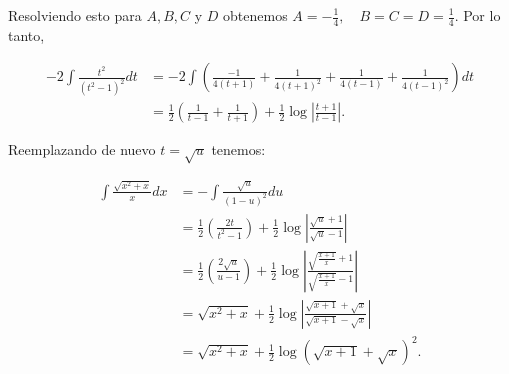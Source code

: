 \documentclass{report}
\begin{document}
\begin{enumerate}
        Resolviendo esto para $A, B, C$ y $D$ obtenemos $A=-\frac{1}{4}, \quad B=C=D=\frac{1}{4}$. Por lo tanto,
        
        \begin{align*}
            -2 \int \frac{t^{2}}{\left(t^{2}-1\right)^{2}} dt &= -2 \int\left(\frac{-1}{4(t+1)}+\frac{1}{4(t+1)^{2}}+\frac{1}{4(t-1)}+\frac{1}{4(t-1)^{2}}\right) dt \\
            &= \frac{1}{2}\left(\frac{1}{t-1}+\frac{1}{t+1}\right)+\frac{1}{2} \log \left|\frac{t+1}{t-1}\right|.
        \end{align*}
        
        Reemplazando de nuevo $t=\sqrt{u}$ tenemos:
        
        $$
        \begin{aligned}
        \int \frac{\sqrt{x^{2}+x}}{x} dx&=-\int \frac{\sqrt{u}}{(1-u)^{2}} du \\
        &=\frac{1}{2}\left(\frac{2 t}{t^{2}-1}\right)+\frac{1}{2} \log \left|\frac{\sqrt{u}+1}{\sqrt{u}-1}\right| \\
        &=\frac{1}{2}\left(\frac{2 \sqrt{u}}{u-1}\right)+\frac{1}{2} \log \left|\frac{\sqrt{\frac{x+1}{x}}+1}{\sqrt{\frac{x+1}{x}}-1}\right| \\
        &=\sqrt{x^{2}+x}+\frac{1}{2} \log \left|\frac{\sqrt{x+1}+\sqrt{x}}{\sqrt{x+1}-\sqrt{x}}\right| \\
        &=\sqrt{x^{2}+x}+\frac{1}{2} \log (\sqrt{x+1}+\sqrt{x})^{2}.
        \end{aligned}
        $$
        
        \end{enumerate}
\end{document}
